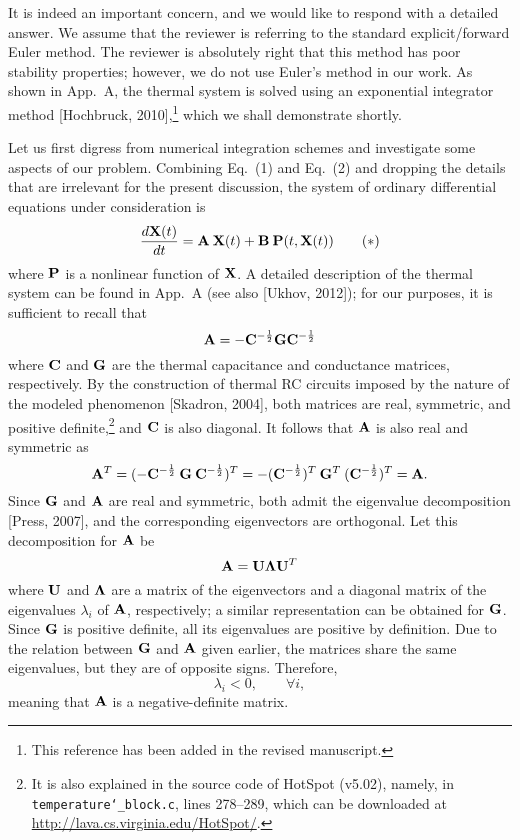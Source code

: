 \begin{authors}
It is indeed an important concern, and we would like to respond with a detailed answer.
We assume that the reviewer is referring to the standard explicit/forward Euler method.
The reviewer is absolutely right that this method has poor stability properties; however, we do not use Euler's method in our work.
As shown in App.~A, the thermal system is solved using an exponential integrator method [Hochbruck, 2010],\footnote{This reference has been added in the revised manuscript.} which we shall demonstrate shortly.

Let us first digress from numerical integration schemes and investigate some aspects of our problem.
Combining Eq.~(1) and Eq.~(2) and dropping the details that are irrelevant for the present discussion, the system of ordinary differential equations under consideration is
\begin{equation}
  \frac{d\vX(\t)}{d\t} = \mA \: \vX(\t) + \mB \: \vP(\t, \vX(\t)) \tag{$\ast$}
\end{equation}
where $\mathbf{P}$ is a nonlinear function of $\mathbf{X}$.
A detailed description of the thermal system can be found in App.~A (see also [Ukhov, 2012]); for our purposes, it is sufficient to recall that
\[
  \mA = -\mC^{-\frac{1}{2}} \mG \mC^{-\frac{1}{2}}
\]
where $\mC$ and $\mG$ are the thermal capacitance and conductance matrices, respectively.
By the construction of thermal RC circuits imposed by the nature of the modeled phenomenon [Skadron, 2004], both matrices are real, symmetric, and positive definite,\footnote{It is also explained in the source code of HotSpot (v5.02), namely, in \texttt{temperature\char`_block.c}, lines 278--289, which can be downloaded at \url{http://lava.cs.virginia.edu/HotSpot/}.} and $\mC$ is also diagonal.
It follows that $\mA$ is also real and symmetric as
\[
  \mA^T = (-\mC^{-\frac{1}{2}} \: \mG \: \mC^{-\frac{1}{2}})^T = -(\mC^{-\frac{1}{2}})^T \: \mG^T \: (\mC^{-\frac{1}{2}})^T = \mA.
\]
Since $\mG$ and $\mA$ are real and symmetric, both admit the eigenvalue decomposition [Press, 2007], and the corresponding eigenvectors are orthogonal.
Let this decomposition for $\mA$ be
\[
    \mA = \m{U} \m{\Lambda} \m{U}^T
\]
where $\m{U}$ and $\m{\Lambda}$ are a matrix of the eigenvectors and a diagonal matrix of the eigenvalues $\lambda_i$ of $\mA$, respectively; a similar representation can be obtained for $\mG$.
Since $\mG$ is positive definite, all its eigenvalues are positive by definition.
Due to the relation between $\mG$ and $\mA$ given earlier, the matrices share the same eigenvalues, but they are of opposite signs.
Therefore,
\[
  \lambda_i < 0, \qquad \forall i,
\]
meaning that $\mA$ is a negative-definite matrix.


\end{authors}
